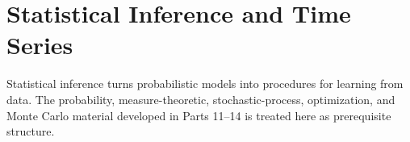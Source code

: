 \part{Statistical Inference and Time Series}

Statistical inference turns probabilistic models into procedures for learning from data.  The probability, measure-theoretic, stochastic-process, optimization, and Monte Carlo material developed in Parts 11--14 is treated here as prerequisite structure.









